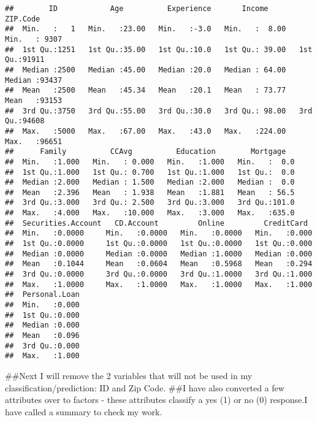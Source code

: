 \documentclass[
]{article}
\begin{document}
\begin{verbatim}
##        ID            Age          Experience       Income          ZIP.Code    
##  Min.   :   1   Min.   :23.00   Min.   :-3.0   Min.   :  8.00   Min.   : 9307  
##  1st Qu.:1251   1st Qu.:35.00   1st Qu.:10.0   1st Qu.: 39.00   1st Qu.:91911  
##  Median :2500   Median :45.00   Median :20.0   Median : 64.00   Median :93437  
##  Mean   :2500   Mean   :45.34   Mean   :20.1   Mean   : 73.77   Mean   :93153  
##  3rd Qu.:3750   3rd Qu.:55.00   3rd Qu.:30.0   3rd Qu.: 98.00   3rd Qu.:94608  
##  Max.   :5000   Max.   :67.00   Max.   :43.0   Max.   :224.00   Max.   :96651  
##      Family          CCAvg          Education        Mortgage    
##  Min.   :1.000   Min.   : 0.000   Min.   :1.000   Min.   :  0.0  
##  1st Qu.:1.000   1st Qu.: 0.700   1st Qu.:1.000   1st Qu.:  0.0  
##  Median :2.000   Median : 1.500   Median :2.000   Median :  0.0  
##  Mean   :2.396   Mean   : 1.938   Mean   :1.881   Mean   : 56.5  
##  3rd Qu.:3.000   3rd Qu.: 2.500   3rd Qu.:3.000   3rd Qu.:101.0  
##  Max.   :4.000   Max.   :10.000   Max.   :3.000   Max.   :635.0  
##  Securities.Account   CD.Account         Online         CreditCard   
##  Min.   :0.0000     Min.   :0.0000   Min.   :0.0000   Min.   :0.000  
##  1st Qu.:0.0000     1st Qu.:0.0000   1st Qu.:0.0000   1st Qu.:0.000  
##  Median :0.0000     Median :0.0000   Median :1.0000   Median :0.000  
##  Mean   :0.1044     Mean   :0.0604   Mean   :0.5968   Mean   :0.294  
##  3rd Qu.:0.0000     3rd Qu.:0.0000   3rd Qu.:1.0000   3rd Qu.:1.000  
##  Max.   :1.0000     Max.   :1.0000   Max.   :1.0000   Max.   :1.000  
##  Personal.Loan  
##  Min.   :0.000  
##  1st Qu.:0.000  
##  Median :0.000  
##  Mean   :0.096  
##  3rd Qu.:0.000  
##  Max.   :1.000
\end{verbatim}

\#\#Next I will remove the 2 variables that will not be used in my
classification/prediction: ID and Zip Code. \#\#I have also converted a
few attributes over to factors - these attributes classify a yes (1) or
no (0) response.I have called a summary to check my work.
\end{document}
